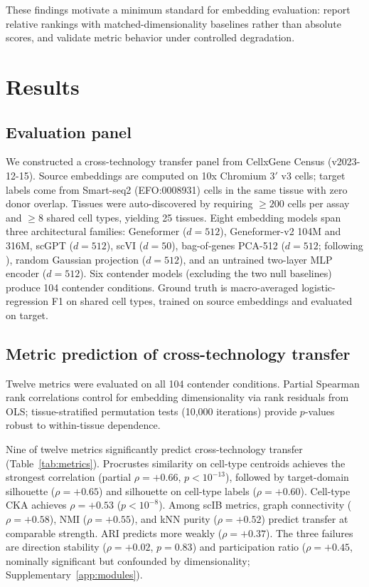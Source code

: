 \documentclass[11pt]{article}
\begin{document}
These findings motivate a minimum standard for embedding evaluation:
report relative rankings with matched-dimensionality baselines rather
than absolute scores, and validate metric behavior under controlled
degradation.


\section{Results}

\subsection{Evaluation panel}
\label{sec:panel}

We constructed a cross-technology transfer panel from CellxGene Census
(v2023-12-15). Source embeddings are computed on 10x Chromium 3$'$ v3
cells; target labels come from Smart-seq2 (EFO:0008931) cells in the
same tissue with zero donor overlap. Tissues were auto-discovered by
requiring $\geq 200$ cells per assay and $\geq 8$ shared cell types,
yielding 25 tissues. Eight embedding models
span three architectural families: Geneformer \citep{theodoris2023geneformer}
($d = 512$), Geneformer-v2 104M and 316M, scGPT \citep{cui2024scgpt}
($d = 512$), scVI \citep{lopez2018scvi} ($d = 50$), bag-of-genes
PCA-512 ($d = 512$; following \citealp{cole2026morpheus}), random
Gaussian projection ($d = 512$), and an untrained two-layer MLP encoder
($d = 512$). Six contender models (excluding the two null baselines)
produce 104 contender conditions. Ground truth is macro-averaged
logistic-regression F1 on shared cell types, trained on source
embeddings and evaluated on target.


\subsection{Metric prediction of cross-technology transfer}
\label{sec:prediction}

Twelve metrics were evaluated on all 104 contender conditions. Partial
Spearman rank correlations control for embedding dimensionality via rank
residuals from OLS; tissue-stratified permutation tests (10,000
iterations) provide $p$-values robust to within-tissue dependence.

Nine of twelve metrics significantly predict cross-technology transfer
(Table~\ref{tab:metrics}). Procrustes similarity on cell-type centroids
achieves the strongest correlation (partial $\rho = +0.66$,
$p < 10^{-13}$), followed by target-domain silhouette ($\rho = +0.65$)
and silhouette on cell-type labels ($\rho = +0.60$). Cell-type CKA
achieves $\rho = +0.53$ ($p < 10^{-8}$). Among scIB metrics, graph
connectivity ($\rho = +0.58$), NMI ($\rho = +0.55$), and kNN purity
($\rho = +0.52$) predict transfer at comparable strength. ARI predicts
more weakly ($\rho = +0.37$). The three failures are
direction stability ($\rho = +0.02$, $p = 0.83$) and
participation ratio ($\rho = +0.45$, nominally significant but
confounded by dimensionality; Supplementary~\ref{app:modules}).
\end{document}

